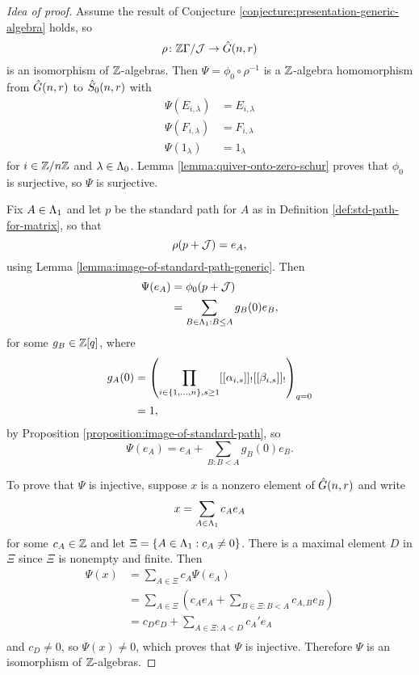 \documentclass[a4paper, 11pt, twoside]{report}
\begin{document}
\begin{proof}[Idea of proof]
Assume the result of Conjecture \ref{conjecture:presentation-generic-algebra} holds, so
\begin{equation*}
\rho\colon\mathbb{Z}\Gamma/{\mathcal{J}}\to\hat{G}(n,r)
\end{equation*}
is an isomorphism of $\mathbb{Z}$-algebras. Then $\Psi=\phi_0\circ\rho^{-1}$ is a $\mathbb{Z}$-algebra homomorphism from $\hat{G}(n,r)$ to $\hat{S}_0(n,r)$ with
\begin{align*}
\Psi(E_{i,\lambda}) &= E_{i,\lambda}\\
\Psi(F_{i,\lambda}) &= F_{i,\lambda}\\
\Psi(1_\lambda) &= 1_\lambda
\end{align*}
for $i\in\mathbb{Z}/{n \mathbb{Z}}$ and $\lambda\in\Lambda_0{}$. Lemma \ref{lemma:quiver-onto-zero-schur} proves that $\phi_0$ is surjective, so $\Psi$ is surjective.

Fix $A\in\Lambda_1{}$ and let $p$ be the standard path for $A$ as in Definition \ref{def:std-path-for-matrix}, so that
\begin{equation*}
\rho(p+\mathcal{J})=e_A,
\end{equation*}
using Lemma \ref{lemma:image-of-standard-path-generic}. Then
\begin{align*}
\Psi(e_A)
&= \phi_0(p+\mathcal{J})\\
&= \sum_{B\in\Lambda_1{}:B\le A} g_B(0) e_B,
\end{align*}
for some $g_B\in\mathbb{Z}[q]$, where
\begin{align*}
g_A(0)
&= \left(\prod_{i\in\{1,\ldots,n\},s\geq 1} [[\alpha_{i,s}]]_![[\beta_{i,s}]]_!\right)_{q=0}\\
&= 1,
\end{align*}
by Proposition \ref{proposition:image-of-standard-path}, so
\begin{equation*}
\Psi(e_A) = e_A +\sum_{B:B<A} g_B(0)e_B.
\end{equation*}

To prove that $\Psi$ is injective, suppose $x$ is a nonzero element of $\hat{G}(n,r)$ and write
\begin{equation*}
x = \sum_{A\in\Lambda_1{}} c_Ae_A
\end{equation*}
for some $c_A\in\mathbb{Z}$ and let $\Xi=\{A\in\Lambda_1{}:c_A\neq 0\}$. There is a maximal element $D$ in $\Xi$ since $\Xi$ is nonempty and finite. Then
\begin{align*}
\Psi(x)
&= \sum_{A\in\Xi} c_A\Psi(e_A)\\
&= \sum_{A\in\Xi} \left(c_Ae_A + \sum_{B\in\Xi:B<A} c_{A,B}e_B\right)\\
&= c_De_D + \sum_{A\in\Xi:A<D} c_A' e_A\\
\end{align*}
and $c_D\neq 0$, so $\Psi(x)\neq 0$, which proves that $\Psi$ is injective. Therefore $\Psi$ is an isomorphism of $\mathbb{Z}$-algebras.
\end{proof}
\end{document}

